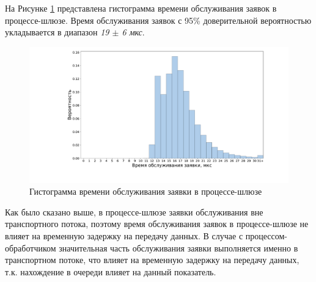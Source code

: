 На Рисунке \ref{chapter41:TRLatency} представлена гистограмма времени обслуживания заявок в процессе-шлюзе. Время обслуживания заявок с 95\% доверительной вероятностью укладывается в диапазон \textit{19 $\pm$ 6 мкс}.
\begin{figure}[!h]
\caption{Гистограмма времени обслуживания заявки в процессе-шлюзе}
\label{chapter41:TRLatency}
\includegraphics[width=\textwidth]{../../graphics/hist/TR}
\end{figure}

Как было сказано выше, в процессе-шлюзе заявки обслуживания вне транспортного потока, поэтому время обслуживания заявок в процессе-шлюзе не влияет на временную задержку на передачу данных. В случае с процессом-обработчиком значительная часть обслуживания заявки выполняется именно в транспортном потоке, что влияет на временную задержку на передачу данных, т.к. нахождение в очереди влияет на данный показатель.
